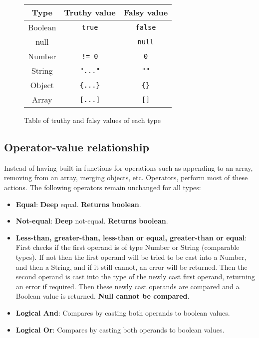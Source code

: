 \documentclass[12pt, letterpaper]{article}
\begin{document}
\begin{figure}[H]
    \begin{center}
        \begin{tabular}{| c | c | c |}
            \hline
            Type & Truthy value & Falsy value\\
            \hline
            Boolean & \verb|true| & \verb|false|\\
            \hline
            null & & \verb|null|\\
            \hline
            Number & \verb|!= 0| & \verb|0|\\
            \hline
            String & \verb|"..."| & \verb|""|\\
            \hline
            Object & \verb|{...}| & \verb|{}|\\
            \hline
            Array & \verb|[...]| & \verb|[]|\\
            \hline
        \end{tabular}
    \end{center}
    \caption{Table of truthy and falsy values of each type}
\end{figure}

\subsection{Operator-value relationship}
\label{sec:operatorvaluerel}

Instead of having built-in functions for operations such as appending to an array, removing from an array, merging objects, etc. Operators, perform most of these actions. The following operators remain unchanged for all types:

\begin{itemize}
    \item \textbf{Equal}: \textbf{Deep} equal. \textbf{Returns boolean}.
    \item \textbf{Not-equal}: \textbf{Deep} not-equal. \textbf{Returns boolean}.
    \item \textbf{Less-than, greater-than, less-than or equal, greater-than or equal}: First checks if the first operand is of type Number or String (comparable types). If not then the first operand will be tried to be cast into a Number, and then a String, and if it still cannot, an error will be returned. Then the second operand is cast into the type of the newly cast first operand, returning an error if required. Then these newly cast operands are compared and a Boolean value is returned. \textbf{Null cannot be compared}.
    \item \textbf{Logical And}: Compares by casting both operands to boolean values.
    \item \textbf{Logical Or}: Compares by casting both operands to boolean values.
\end{itemize}
\end{document}
